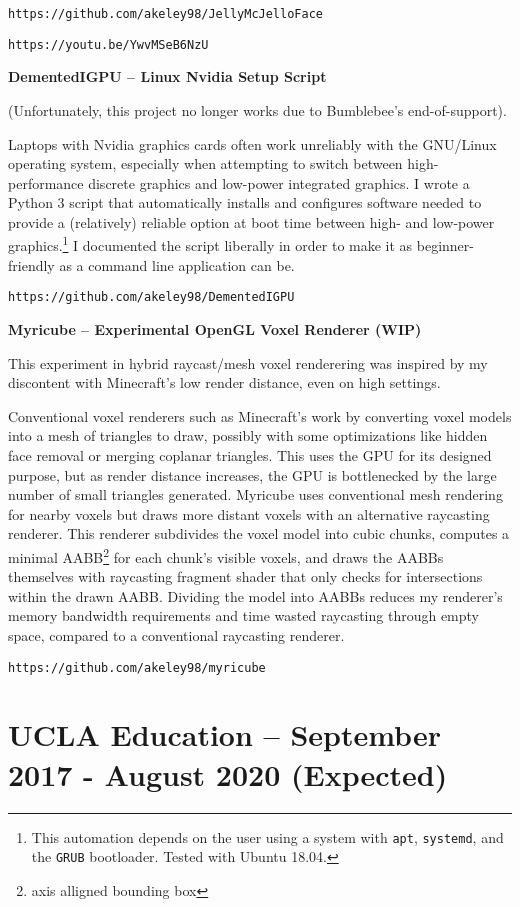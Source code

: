 \documentclass[11pt]{article}
\begin{document}
\quad\texttt{https://github.com/akeley98/JellyMcJelloFace}

\quad\texttt{https://youtu.be/YwvMSeB6NzU}

\textbf{DementedIGPU -- Linux Nvidia Setup Script}

(Unfortunately, this project no longer works due to Bumblebee's
end-of-support).

Laptops with Nvidia graphics cards often work unreliably with the
GNU/Linux operating system, especially when attempting to switch
between high-performance discrete graphics and low-power integrated
graphics. I wrote a Python 3 script that automatically installs and
configures software needed to provide a (relatively) reliable option
at boot time between high- and low-power graphics.\footnote{This
  automation depends on the user using a system with \texttt{apt},
  \texttt{systemd}, and the \texttt{GRUB} bootloader. Tested with
  Ubuntu 18.04.} I documented the script liberally in order to make it
as beginner-friendly as a command line application can be.

\quad\texttt{https://github.com/akeley98/DementedIGPU}

\textbf{Myricube -- Experimental OpenGL Voxel Renderer (WIP)}

This experiment in hybrid raycast/mesh voxel renderering was inspired
by my discontent with Minecraft's low render distance, even on high
settings.

Conventional voxel renderers such as Minecraft's work by converting
voxel models into a mesh of triangles to draw, possibly with some
optimizations like hidden face removal or merging coplanar
triangles. This uses the GPU for its designed purpose, but as render
distance increases, the GPU is bottlenecked by the large number of
small triangles generated. Myricube uses conventional mesh rendering
for nearby voxels but draws more distant voxels with an alternative
raycasting renderer. This renderer subdivides the voxel model into
cubic chunks, computes a minimal AABB\footnote{axis alligned bounding
  box} for each chunk's visible voxels, and draws the AABBs themselves
with raycasting fragment shader that only checks for intersections
within the drawn AABB.  Dividing the model into AABBs reduces my
renderer's memory bandwidth requirements and time wasted raycasting
through empty space, compared to a conventional raycasting renderer.

\texttt{https://github.com/akeley98/myricube}

\newpage
\section{UCLA Education -- September 2017 - August 2020 (Expected)}
\end{document}
